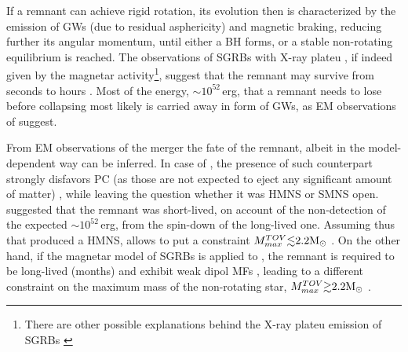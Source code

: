 If a remnant can achieve rigid rotation, its evolution then is characterized by the emission 
of \acp{GW} (due to residual asphericity) and magnetic braking, reducing further its 
angular momentum, until either a \ac{BH} forms, or a stable non-rotating equilibrium is reached.
The observations of \acp{SGRB} with X-ray plateu 
\citep{Zhang:2000wx,Lasky:2015lej,Fan:2013cra}, if indeed given by the 
magnetar activity\footnote{
    There are other possible explanations behind the X-ray plateu emission of \acp{SGRB} 
    \citep{Oganesyan:2019jij}
}, suggest that the remnant may survive from seconds to hours \citep{Fan:2013cra,Ravi:2014gxa}.
Most of the energy, ${\sim}10^{52}\,$erg, that a remnant needs to lose before collapsing 
most likely is carried away in form of \acp{GW}, as \ac{EM} observations of \GW{} suggest.

From \ac{EM} observations of the merger the fate of the remnant, albeit in the 
model-dependent way can be inferred. In case of \GW{}, the presence of such counterpart 
strongly disfavors \ac{PC} (as those are not expected to eject any significant amount 
of matter) \citep{Margalit:2017dij,Bauswein:2017vtn,Radice:2017lry}, while leaving 
the question whether it was \ac{HMNS} or \ac{SMNS} open. \citet{Margalit:2017dij} suggested 
that the remnant was short-lived, on account of the non-detection of the expected ${\sim}10^{52}\,$erg, 
from the spin-down of the long-lived one. Assuming thus that \GW{} produced a \ac{HMNS}, 
allows to put a constraint $M_{max}^{TOV}{\lesssim}2.2{\text{M}_{\odot}}$ \citep{Margalit:2017dij}.
%
On the other hand, if the magnetar model of \acp{SGRB} is applied to \GW{} 
\citep{Ai:2018jtv,Li:2018hzy,Piro:2018bpl}, the remnant is required to be long-lived
(months) and exhibit weak dipol \acp{MF} \citep{Ai:2018jtv}, leading to a different 
constraint on the maximum mass of the non-rotating star, $M_{max}^{TOV}{\gtrsim}2.2{\text{M}_{\odot}}$ 
. 




